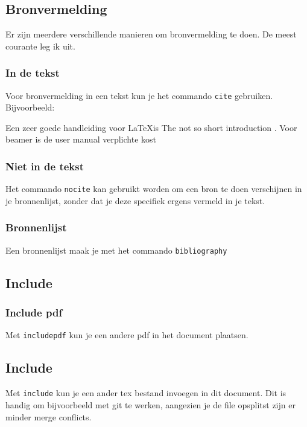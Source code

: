 \documentclass{article} %
\begin{document}
		\subsection{Bronvermelding}
			Er zijn meerdere verschillende manieren om bronvermelding te doen. De meest courante leg ik uit.
			
			\subsubsection{In de tekst}
				Voor bronvermelding in een tekst kun je het commando \texttt{cite} gebruiken. Bijvoorbeeld:
			
				Een zeer goede handleiding voor \LaTeX is The not so short introduction \cite{oetiker1995not}. Voor beamer is de user manual \cite{tantau2004user} verplichte kost
			
			\subsubsection{Niet in de tekst}
				Het commando \texttt{nocite} kan gebruikt worden om een bron te doen verschijnen in je bronnenlijst, zonder dat je deze specifiek ergens vermeld in je tekst.
				\nocite{wikipedia:LaTeX}
	
			\subsubsection{Bronnenlijst}
				Een bronnenlijst maak je met het commando \texttt{bibliography}
				
				
				
		\subsection{Include}
			\subsubsection{Include pdf}
				Met \texttt{includepdf} kun je een andere pdf in het document plaatsen.
				
				

			\subsection{Include}
				Met \texttt{include} kun je een ander tex bestand invoegen in dit document.
				Dit is handig om bijvoorbeeld met git te werken, aangezien je de file opsplitst zijn er minder merge conflicts.
				
\end{document}

